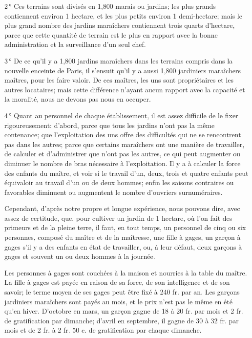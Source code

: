 \documentclass[10pt,a4paper]{book}
\begin{document}
2\,° Ces terrains sont divisés en 1,800 marais ou jardins; les plus grands contiennent environ 1 hectare, et les plus petits environ 1 demi-hectare; mais le plus grand nombre des jardins maraîchers contiennent trois quarts d'hectare, parce que cette quantité de terrain est le plus en rapport avec la bonne administration et la surveillance d'un seul chef.

3\,° De ce qu'il y a 1,800 jardins maraîchers dans les terrains compris dans la nouvelle enceinte de Paris, il s'ensuit qu'il y a aussi 1,800 jardiniers maraîchers maîtres, pour les faire valoir. De ces maîtres, les uns sont propriétaires et les autres locataires; mais cette différence n'ayant aucun rapport avec la capacité et la moralité, nous ne devons pas nous en occuper.

4\,°\label{personnel} Quant au personnel de chaque établissement, il est assez difficile de le fixer rigoureusement: d'abord, parce que tous les jardins n'ont pas la même contenance; que l'exploitation des uns offre des difficultés qui ne se rencontrent pas dans les autres; parce que certains maraîchers ont une manière de travailler, de calculer et d'administrer que n'ont pas les autres, ce qui peut augmenter ou diminuer le nombre de bras nécessaire à l'exploitation. Il y a à calculer la force des enfants du maître, et voir si le travail d'un, deux, trois et quatre enfants peut équivaloir au travail d'un ou de deux hommes; enfin les saisons contraires ou favorables diminuent ou augmentent le nombre d'ouvriers surnuméraires.

Cependant, d'après notre propre et longue expérience, nous pouvons dire, avec assez de certitude, que, pour cultiver un jardin de 1 hectare, où l'on fait des primeurs et de la pleine terre, il faut, en tout temps, un personnel de cinq ou six personnes, composé du maître et de la maîtresse, une fille à gages, un garçon à gages s'il y a des enfants en état de travailler, ou, à leur défaut, deux garçons à gages et souvent un ou deux hommes à la journée.

Les personnes à gages sont couchées à la maison et nourries à la table du maître. La fille à gages est payée en raison de sa force, de son intelligence et de son savoir; le terme moyen de ses gages peut être fixé à 240 fr. par an. Les garçons jardiniers maraîchers sont payés au mois, et le prix n'est pas le même en été qu'en hiver. D'octobre en mars, un garçon gagne de 18 à 20 fr. par mois et 2 fr. de gratification par dimanche; d'avril en septembre, il gagne de 30 à 32 fr. par mois et de 2 fr. à 2 fr. 50 c. de gratification par chaque dimanche.
\end{document}
